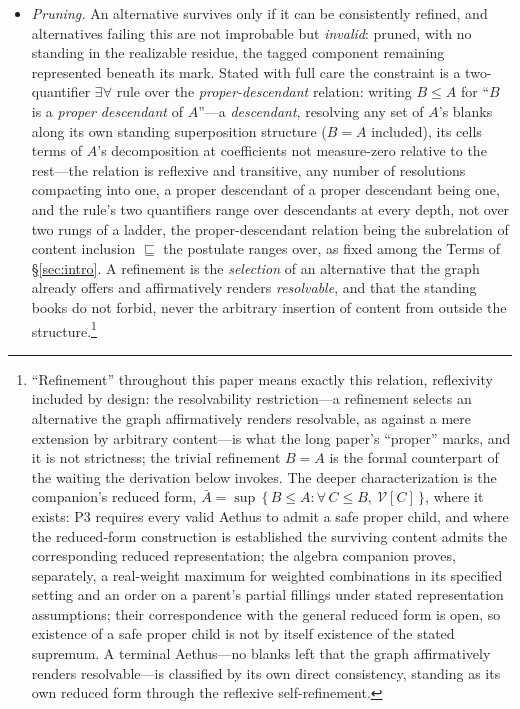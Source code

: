 \documentclass[11pt]{article}
\theoremstyle{definition}
\newcommand{\Aethus}{Aethus}
\begin{document}
\begin{itemize}
\item[\textbf{P3.}] \emph{Pruning.} An alternative survives only if it can be consistently refined, and alternatives failing this are not improbable but \emph{invalid}: pruned, with no standing in the realizable residue, the tagged component remaining represented beneath its mark. Stated with full care the constraint is a two-quantifier $\exists\forall$ rule over the \emph{proper-descendant} relation: writing $B \le A$ for ``$B$ is a \emph{proper descendant} of $A$''---a \emph{descendant}, resolving any set of $A$'s blanks along its own standing superposition structure ($B = A$ included), its cells terms of $A$'s decomposition at coefficients not measure-zero relative to the rest---the relation is reflexive and transitive, any number of resolutions compacting into one, a proper descendant of a proper descendant being one, and the rule's two quantifiers range over descendants at every depth, not over two rungs of a ladder, the proper-descendant relation being the subrelation of content inclusion $\sqsubseteq$ the postulate ranges over, as fixed among the Terms of \S\ref{sec:intro}. A refinement is the \emph{selection} of an alternative that the graph already offers and affirmatively renders \emph{resolvable}, and that the standing books do not forbid, never the arbitrary insertion of content from outside the structure.\footnote{``Refinement'' throughout this paper means exactly this relation, reflexivity included by design: the resolvability restriction---a refinement selects an alternative the graph affirmatively renders resolvable, as against a mere extension by arbitrary content---is what the long paper's ``proper'' marks, and it is not strictness; the trivial refinement $B = A$ is the formal counterpart of the waiting the derivation below invokes. The deeper characterization is the companion's reduced form, $\bar{A} = \sup\,\{\,B \le A : \forall\, C \le B,\ \mathcal{V}[C]\,\}$, where it exists: P3 requires every valid \Aethus{} to admit a safe proper child, and where the reduced-form construction is established the surviving content admits the corresponding reduced representation; the algebra companion proves, separately, a real-weight maximum for weighted combinations in its specified setting and an order on a parent's partial fillings under stated representation assumptions; their correspondence with the general reduced form is open, so existence of a safe proper child is not by itself existence of the stated supremum. A terminal \Aethus{}---no blanks left that the graph affirmatively renders resolvable---is classified by its own direct consistency, standing as its own reduced form through the reflexive self-refinement.}

\end{itemize}
\end{document}
